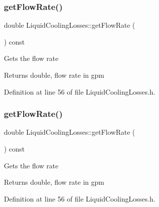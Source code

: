 \subsubsection{\texorpdfstring{get\+Flow\+Rate()}{getFlowRate()}\hspace{0.1cm}{\footnotesize\ttfamily [2/3]}}
{\footnotesize\ttfamily double Liquid\+Cooling\+Losses\+::get\+Flow\+Rate (\begin{DoxyParamCaption}{ }\end{DoxyParamCaption}) const\hspace{0.3cm}{\ttfamily [inline]}}

Gets the flow rate

\begin{DoxyReturn}{Returns}
double, flow rate in gpm 
\end{DoxyReturn}


Definition at line 56 of file Liquid\+Cooling\+Losses.\+h.

\mbox{\label{class_liquid_cooling_losses_acb4a68199bdc5f0597d1feadc3ecdb2c}} 
\subsubsection{\texorpdfstring{get\+Flow\+Rate()}{getFlowRate()}\hspace{0.1cm}{\footnotesize\ttfamily [3/3]}}
{\footnotesize\ttfamily double Liquid\+Cooling\+Losses\+::get\+Flow\+Rate (\begin{DoxyParamCaption}{ }\end{DoxyParamCaption}) const\hspace{0.3cm}{\ttfamily [inline]}}

Gets the flow rate

\begin{DoxyReturn}{Returns}
double, flow rate in gpm 
\end{DoxyReturn}


Definition at line 56 of file Liquid\+Cooling\+Losses.\+h.

\mbox{\label{class_liquid_cooling_losses_a6a131f8f3141edef7f29df4455c6aee5}} 
